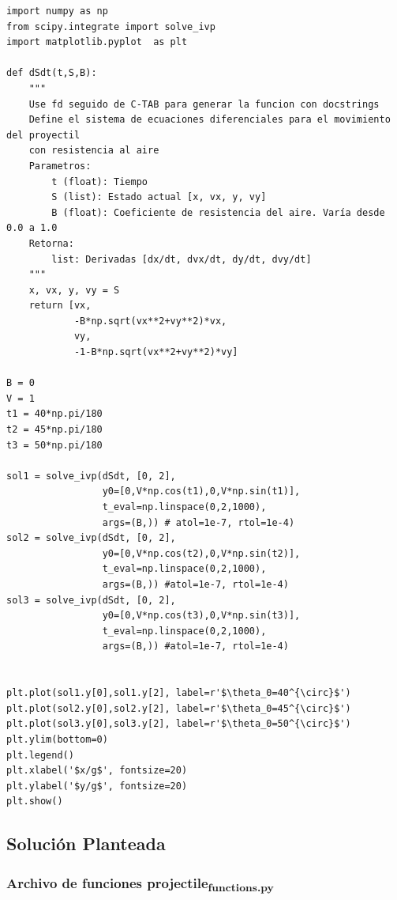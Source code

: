 \documentclass{article}
\begin{document}
\begin{verbatim}
import numpy as np
from scipy.integrate import solve_ivp
import matplotlib.pyplot  as plt

def dSdt(t,S,B):
    """
    Use fd seguido de C-TAB para generar la funcion con docstrings
    Define el sistema de ecuaciones diferenciales para el movimiento del proyectil
    con resistencia al aire
    Parametros:
        t (float): Tiempo
        S (list): Estado actual [x, vx, y, vy]
        B (float): Coeficiente de resistencia del aire. Varía desde 0.0 a 1.0
    Retorna:
        list: Derivadas [dx/dt, dvx/dt, dy/dt, dvy/dt]
    """
    x, vx, y, vy = S
    return [vx,
            -B*np.sqrt(vx**2+vy**2)*vx,
            vy,
            -1-B*np.sqrt(vx**2+vy**2)*vy]

B = 0
V = 1
t1 = 40*np.pi/180
t2 = 45*np.pi/180
t3 = 50*np.pi/180

sol1 = solve_ivp(dSdt, [0, 2],
                 y0=[0,V*np.cos(t1),0,V*np.sin(t1)],
                 t_eval=np.linspace(0,2,1000),
                 args=(B,)) # atol=1e-7, rtol=1e-4)
sol2 = solve_ivp(dSdt, [0, 2],
                 y0=[0,V*np.cos(t2),0,V*np.sin(t2)],
                 t_eval=np.linspace(0,2,1000),
                 args=(B,)) #atol=1e-7, rtol=1e-4)
sol3 = solve_ivp(dSdt, [0, 2],
                 y0=[0,V*np.cos(t3),0,V*np.sin(t3)],
                 t_eval=np.linspace(0,2,1000),
                 args=(B,)) #atol=1e-7, rtol=1e-4)


plt.plot(sol1.y[0],sol1.y[2], label=r'$\theta_0=40^{\circ}$')
plt.plot(sol2.y[0],sol2.y[2], label=r'$\theta_0=45^{\circ}$')
plt.plot(sol3.y[0],sol3.y[2], label=r'$\theta_0=50^{\circ}$')
plt.ylim(bottom=0)
plt.legend()
plt.xlabel('$x/g$', fontsize=20)
plt.ylabel('$y/g$', fontsize=20)
plt.show()

\end{verbatim}
\subsection{Solución Planteada}
\label{sec:org2419dcf}
\subsubsection{Archivo de funciones projectile\textsubscript{functions.py}}
\label{sec:orgbc13258}
\end{document}
